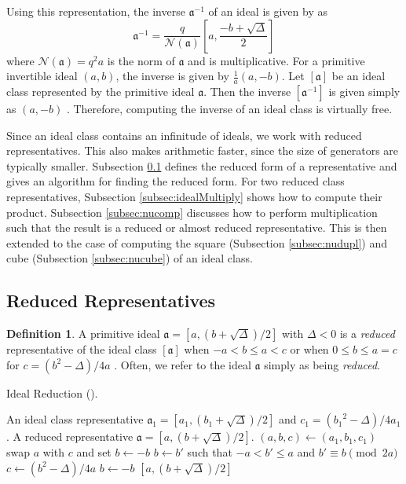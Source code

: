 \documentclass{ucalgthes1}
\theoremstyle{definition}
\newtheorem{defn}[thm]{Definition}
\newcommand{\ideal}{\mathfrak}
\newcommand{\idealclass}[1]{\left[ \ideal #1 \right]}
\newcommand{\aclass}{\idealclass a}
\begin{document}
Using this representation, the inverse $\ideal a^{-1}$ of an ideal is given by \cite[pp.14--15]{Jacobson1999} as
\begin{equation}
\label{eq:idealInverse}
	{\ideal a}^{-1} = \frac{q}{\mathcal N(\mathfrak a)} \left[a, \frac{-b+\sqrt{\Delta}}{2} \right]
\end{equation}
where $\mathcal N(\ideal a) = q^2a$ is the norm of $\ideal a$ and is multiplicative.  For a primitive invertible ideal $(a, b)$, the inverse is given by $\frac{1}{a}(a, -b)$.  Let $\aclass$ be an ideal class represented by the primitive ideal $\ideal a$.  Then the inverse $\idealclass{a^{-1}}$ is given simply as $(a, -b)$ \cite[p.20]{Ramachandran2006}.  Therefore, computing the inverse of an ideal class is virtually free. 

Since an ideal class contains an infinitude of ideals, we work with reduced representatives.  This also makes arithmetic faster, since the size of generators are typically smaller.  Subsection \ref{subsec:reduction} defines the reduced form of a representative and gives an algorithm for finding the reduced form.  For two reduced class representatives, Subsection \ref{subsec:idealMultiply} shows how to compute their product.  Subsection \ref{subsec:nucomp} discusses how to perform multiplication such that the result is a reduced or almost reduced representative.  This is then extended to the case of computing the square (Subsection \ref{subsec:nudupl}) and cube (Subsection \ref{subsec:nucube}) of an ideal class.  

\subsection{Reduced Representatives}
\label{subsec:reduction}

\begin{defn}
\label{defn:reducedIdeal}
A primitive ideal $\ideal a = [a, (b+\sqrt{\Delta})/2]$ with $\Delta < 0$ is a \emph{reduced} representative of the ideal class $\aclass$ when $-a < b \le a < c$ or when $0 \le b \le a = c$ for $c = (b^2 - \Delta)/4a$ \cite[p.241]{Crandall2001}.  Often, we refer to the ideal $\ideal a$ simply as being \emph{reduced}.
\end{defn}

\begin{algorithm}[htb]
\caption{Ideal Reduction (\cite[p.90]{Jacobson2006}).}
\label{alg:reduce}
\begin{algorithmic}[1]
\Require An ideal class representative $\ideal a_1 = [a_1, (b_1+\sqrt\Delta)/2]$ and $c_1 = ({b_1}^2 - \Delta)/4a_1$.
\Ensure A reduced representative $\ideal a = [a, (b+\sqrt\Delta)/2]$.
\State $(a, b, c) \gets (a_1, b_1, c_1)$
		\State swap $a$ with $c$ and set $b \gets -b$
	\EndIf
		\State $b \gets b'$ such that $-a < b' \le a$ and $b' \equiv b \pmod{2a}$
		\State $c \gets (b^2-\Delta)/4a$
	\EndIf
\EndWhile
{}
	\State $b \gets -b$
\EndIf
\State \Return $[a, (b+\sqrt\Delta)/2]$
\end{algorithmic}
\end{algorithm}
\end{document}
